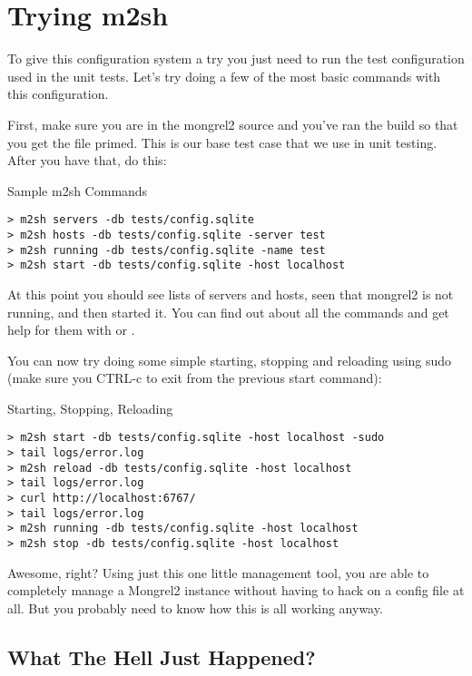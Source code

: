 \section{Trying m2sh}

To give this configuration system a try you just need to run the test configuration used
in the unit tests.  Let's try doing a few of the most basic commands with this configuration.

First, make sure you are in the mongrel2 source and you've ran the build so that you get the
 file primed.  This is our base test case that we use in unit testing.
After you have that, do this:

\begin{code}{Sample m2sh Commands}
\begin{lstlisting}
> m2sh servers -db tests/config.sqlite
> m2sh hosts -db tests/config.sqlite -server test
> m2sh running -db tests/config.sqlite -name test
> m2sh start -db tests/config.sqlite -host localhost
\end{lstlisting}
\end{code}

At this point you should see lists of servers and hosts, seen that mongrel2 is
not running, and then started it.  You can find out about all the commands and
get help for them with  or .

You can now try doing some simple starting, stopping and reloading using sudo (make sure you CTRL-c
to exit from the previous start command):

\begin{code}{Starting, Stopping, Reloading}
\begin{lstlisting}
> m2sh start -db tests/config.sqlite -host localhost -sudo
> tail logs/error.log
> m2sh reload -db tests/config.sqlite -host localhost
> tail logs/error.log
> curl http://localhost:6767/
> tail logs/error.log
> m2sh running -db tests/config.sqlite -host localhost
> m2sh stop -db tests/config.sqlite -host localhost
\end{lstlisting}
\end{code}

Awesome, right?  Using just this one little management tool, you
are able to completely manage a Mongrel2 instance without having to hack
on a config file at all.  But you probably need to know how this is all
working anyway.


\subsection{What The Hell Just Happened?}

